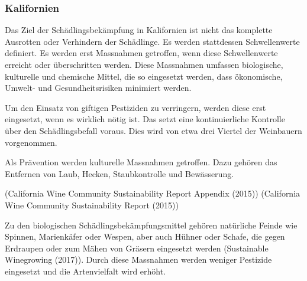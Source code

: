 \subsubsection{Kalifornien}
\label{sub:sch_dlingsbek_mpfung}

Das Ziel der Schädlingsbekämpfung in Kalifornien ist nicht das komplette Ausrotten oder Verhindern
der Schädlinge. Es werden stattdessen Schwellenwerte definiert. Es werden erst Massnahmen getroffen,
wenn diese Schwellenwerte erreicht oder überschritten werden. Diese Massnahmen umfassen biologische,
kulturelle und chemische Mittel, die so eingesetzt werden, dass ökonomische, Umwelt- und
Gesundheitsrisiken minimiert werden.

Um den Einsatz von giftigen Pestiziden zu verringern, werden diese erst eingesetzt, wenn es wirklich
nötig ist. Das setzt eine kontinuierliche Kontrolle über den Schädlingsbefall voraus. Dies wird von
etwa drei Viertel der Weinbauern vorgenommen.

Als Prävention werden kulturelle Massnahmen getroffen. Dazu gehören das Entfernen von Laub, Hecken,
Staubkontrolle und Bewässerung.

(\glqq{}California Wine Community Sustainability Report Appendix\grqq{} (2015))
(\glqq{}California Wine Community Sustainability Report\grqq{} (2015))

Zu den biologischen Schädlingsbekämpfungsmittel gehören natürliche Feinde wie Spinnen, Marienkäfer
oder Wespen, aber auch Hühner oder Schafe, die gegen Erdraupen oder zum Mähen von Gräsern eingesetzt
werden  (\glqq{}Sustainable Winegrowing\grqq{} (2017)).  Durch diese Massnahmen werden weniger
Pestizide eingesetzt und die Artenvielfalt wird erhöht.